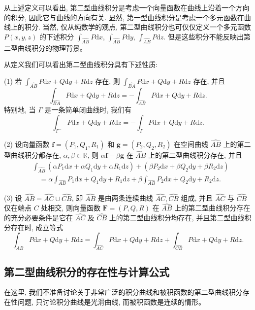 \documentclass[UTF8, 12pt, fontset=fandol, oneside]{ctexart}
\begin{document}
从上述定义可以看出, 第二型曲线积分是考虑一个向量函数在曲线上沿着一个方向的积分, 因此它与曲线的方向有关. 显然, 第一型曲线积分是考虑一个多元函数在曲线上的积分. 当然, 仅从纯数学的观点, 第二型曲线积分也可仅仅定义一个多元函数 $P(x,y,z)$ 的下述积分 $\int_{\widehat{AB}}P\mathrm dx$, $\int_{\widehat{AB}}P\mathrm dy$, $\int_{\widehat{AB}}P\mathrm dz$. 但是这些积分不能反映出第二型曲线积分的物理背景。

从定义我们可以看出第二型曲线积分具有下述性质:

(1) 若 $\int_{\widehat{AB}}P\mathrm dx+Q\mathrm dy+R\mathrm dz$ 存在, 则 $\int_{\widehat{BA}}P\mathrm dx+Q\mathrm dy+R\mathrm dz$ 存在, 并且
\[
  \int_{\widehat{BA}}P\mathrm dx+Q\mathrm dy+R\mathrm dz
  =-\int_{\widehat{AB}}P\mathrm dx+Q\mathrm dy+R\mathrm dz.
\]
特别地, 当 $\Gamma$ 是一条简单闭曲线时, 我们有
\[
  \int_{\Gamma^-}P\mathrm dx+Q\mathrm dy+R\mathrm dz
  =-\int_\Gamma P\mathrm dx+Q\mathrm dy+R\mathrm dz.
\]

(2) 设向量函数 $\boldsymbol f=(P_1,Q_1,R_1)$ 和 $\boldsymbol g=(P_2,Q_2,R_2)$ 在空间曲线 $\widehat{AB}$ 上的第二型曲线积分都存在, $\alpha,\beta\in\mathbb R$, 则 $\alpha\boldsymbol f+\beta\boldsymbol g$ 在 $\widehat{AB}$ 上的第二型曲线积分存在, 并且
\[
\begin{aligned}
  &\int_{\widehat{AB}}(\alpha P_1\mathrm dx+\alpha Q_1\mathrm dy+\alpha R_1\mathrm dz)
  +(\beta P_2\mathrm dx+\beta Q_2\mathrm dy+\beta R_2\mathrm dz)\\
  &\quad=\alpha\int_{\widehat{AB}}P_1\mathrm dx+Q_1\mathrm dy+R_1\mathrm dz
  +\beta\int_{\widehat{AB}}P_2\mathrm dx+Q_2\mathrm dy+R_2\mathrm dz.
\end{aligned}
\]

(3) 设 $\widehat{AB}=\widehat{AC}\cup\widehat{CB}$, 即 $\widehat{AB}$ 是由两条连续曲线 $\widehat{AC},\widehat{CB}$ 组成, 并且 $\widehat{AC}$ 与 $\widehat{CB}$ 仅在端点 $C$ 处相交, 则向量函数 $\boldsymbol F=(P,Q,R)$ 在 $\widehat{AB}$ 上的第二型曲线积分存在的充分必要条件是它在 $\widehat{AC}$ 及 $\widehat{CB}$ 上的第二型曲线积分均存在, 并且第二型曲线积分存在时, 成立等式
\[
  \int_{\widehat{AB}}P\mathrm dx+Q\mathrm dy+R\mathrm dz
  =\int_{\widehat{AC}}P\mathrm dx+Q\mathrm dy+R\mathrm dz
  +\int_{\widehat{CB}}P\mathrm dx+Q\mathrm dy+R\mathrm dz.
\]

\subsection{第二型曲线积分的存在性与计算公式}

在这里, 我们不准备讨论关于非常广泛的积分曲线和被积函数的第二型曲线积分存在性问题, 只讨论积分曲线是光滑曲线, 而被积函数是连续的情形。
\end{document}
